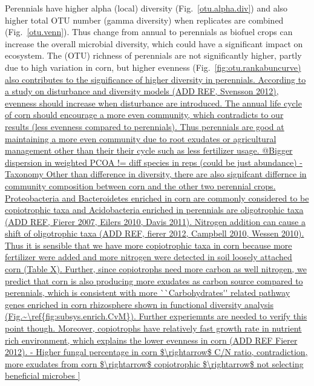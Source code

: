 \documentclass[12pt]{article}
\begin{document}
Perennials have higher alpha (local) diversity (Fig.~\ref{otu.alpha.div}) and also higher total OTU number (gamma diversity) when replicates are combined (Fig.~\ref{otu.venn}). Thus change from annual to perennials as biofuel crops can increase the overall microbial diversity, which could have a significant impact on ecosystem. The (OTU) richness of perennials are not significantly higher, partly due to high variation in corn, but higher evenness (Fig.~\ref{fig:otu.rankabuncurve) also contributes to the significance of higher diversity in perennials. 

According to a study on disturbance and diversity models (ADD REF, Svensson 2012), evenness should increase when disturbance are introduced. The annual life cycle of corn should encourage a more even community, which contradicts to our results (less evenness compared to perennials). Thus perennials are good at maintaining a more even community due to root exudates or agricultural management other than their their cycle such as less fertilizer usage.

@Bigger dispersion in weighted PCOA != diff species in reps (could be just abundance)

- Taxonomy

Other than difference in diversity, there are also signifcant differnce in community composition between corn and the other two perennial crops. Proteobacteria and Bacteroidetes enriched in corn are commonly considered to be copiotrophic taxa and Acidobacteria enriched in perennials are oligotrophic taxa (ADD REF, Fierer 2007, Eilers 2010, Davis 2011). Nitrogen addition can cause a shift of oligotrophic taxa (ADD REF, fierer 2012, Campbell 2010, Wessen 2010). Thus it is sensible that we have more copiotrophic taxa in corn because more fertilizer were added and more nitrogen were detected in soil loosely attached corn (Table X). Further, since copiotrophs need more carbon as well nitrogen, we predict that corn is also producing more exudates as carbon source compared to perennials, which is consistent with more ``Carbohydrates'' related pathway genes enriched in corn rhizosphere shown in functional diversity analysis (Fig.~\ref{fig:subsys.enrich.CvM}). Further experiemnts are needed to verify this point though. Moreover, copiotrophs have relatively fast growth rate in nutrient rich environment, which explains the lower evenness in corn (ADD REF Fierer 2012).

- Higher fungal percentage in corn $\rightarrow$ C/N ratio, contradiction, more exudates from corn $\rightarrow$ copiotrophic $\rightarrow$ not selecting beneficial microbes

}
\end{document}
